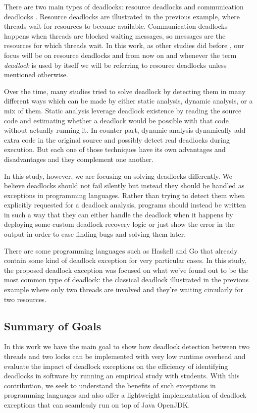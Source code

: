 There are two main types of deadlocks: resource deadlocks and communication deadlocks \cite{singhal} \cite{knapp}. Resource deadlocks are illustrated in the previous
example, where threads wait for resources to become available. Communication deadlocks happens when threads are blocked waiting messages, so messages are the resources
for which threads wait. In this work, as other studies did before \cite{mcsdk} \cite{magicfuzzer}, our focus will be on resource deadlocks and from now on and whenever the term \emph{deadlock} is used by itself we will be referring to resource deadlocks unless mentioned otherwise.

Over the time, many studies tried to solve deadlock by detecting them in many different ways which can be made by either static analysis, dynamic analysis, or a mix of them. Static analysis leverage deadlock existence by reading the source code and estimating whether a deadlock would be possible with that code without actually running it. In counter part, dynamic analysis dynamically add extra code in the original source and possibly detect real deadlocks during execution. But each one of those techniques
have its own advantages and disadvantages and they complement one another.

In this study, however, we are focusing on solving deadlocks differently. We believe deadlocks should not fail silently but instead they should be handled as exceptions in programming languages. Rather than trying to detect them when explicitly requested for a deadlock analysis, programs should instead be written in such a way that they can either handle the deadlock when it happens by deploying some custom deadlock recovery logic or just show the error in the output in order to ease finding bugs and solving them later.

There are some programming languages such as Haskell and Go that already contain some kind of deadlock exception for very particular cases. In this study, the proposed deadlock exception was focused on what we've found out to be the most common type of deadlock: the classical deadlock illustrated in the previous example where only two threads are involved and they're waiting circularly for two resources.

\subsection{Summary of Goals}

In this work we have the main goal to show how deadlock detection between two threads and two locks can be implemented with very low runtime overhead and evaluate the impact of deadlock exceptions on the efficiency of identifying deadlocks in software by running an empirical study with students. With this contribution, we seek to understand the benefits of such exceptions in programming languages and also offer a lightweight implementation of deadlock exceptions that can seamlessly run on top of Java OpenJDK.

